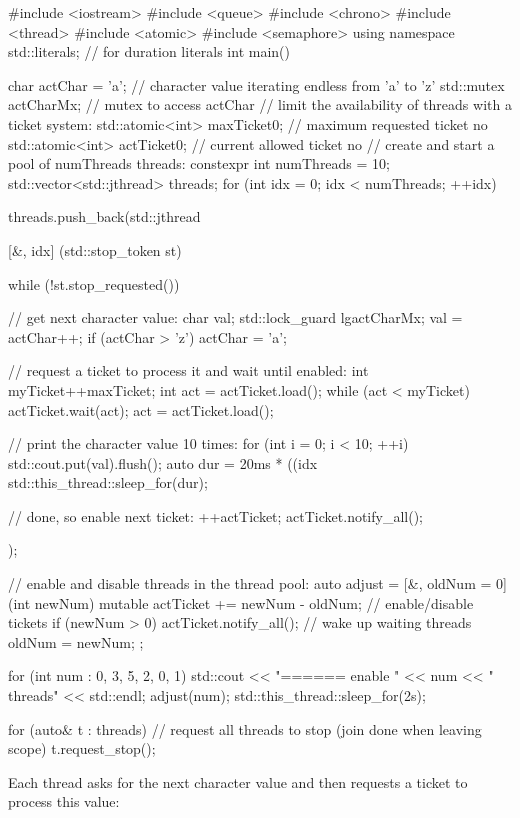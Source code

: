 \begin{cpp}
#include <iostream>
#include <queue>
#include <chrono>
#include <thread>
#include <atomic>
#include <semaphore>
using namespace std::literals; // for duration literals
int main()
{
	char actChar = 'a'; // character value iterating endless from ’a’ to ’z’
	std::mutex actCharMx; // mutex to access actChar
	// limit the availability of threads with a ticket system:
	std::atomic<int> maxTicket{0}; // maximum requested ticket no
	std::atomic<int> actTicket{0}; // current allowed ticket no
	// create and start a pool of numThreads threads:
	constexpr int numThreads = 10;
	std::vector<std::jthread> threads;
	for (int idx = 0; idx < numThreads; ++idx) {
		threads.push_back(std::jthread{[&, idx] (std::stop_token st) {
										while (!st.stop_requested()) {
											// get next character value:
											char val;
											{
												std::lock_guard lg{actCharMx};
												val = actChar++;
												if (actChar > 'z') actChar = 'a';
												}
												
												// request a ticket to process it and wait until enabled:
												int myTicket{++maxTicket};
												int act = actTicket.load();
												while (act < myTicket) {
												actTicket.wait(act);
												act = actTicket.load();
												}
												
												// print the character value 10 times:
												for (int i = 0; i < 10; ++i) {
												std::cout.put(val).flush();
												auto dur = 20ms * ((idx %
												std::this_thread::sleep_for(dur);
												}
												
												// done, so enable next ticket:
												++actTicket;
												actTicket.notify_all();
											}
										}});
	}
	
	// enable and disable threads in the thread pool:
	auto adjust = [&, oldNum = 0] (int newNum) mutable {
					actTicket += newNum - oldNum; // enable/disable tickets
					if (newNum > 0) actTicket.notify_all(); // wake up waiting threads
					oldNum = newNum;
					};
					
	for (int num : {0, 3, 5, 2, 0, 1}) {
		std::cout << "\n====== enable " << num << " threads" << std::endl;
		adjust(num);
		std::this_thread::sleep_for(2s);
	}
	
	for (auto& t : threads) { // request all threads to stop (join done when leaving scope)
		t.request_stop();
	}
}
\end{cpp}

Each thread asks for the next character value and then requests a ticket to process this value:

